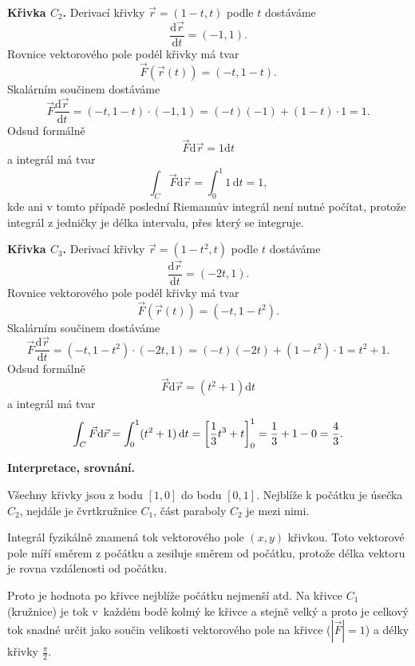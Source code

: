 \stranka

\textbf{Křivka $C_2$.}
Derivací křivky $\vec r=(1-t,t)$ podle $t$ dostáváme
$$\frac{\mathrm d\vec r}{\mathrm dt}=(-1,1).$$
Rovnice vektorového pole podél křivky má tvar
$$\vec F(\vec r(t))=(-t,1-t).$$
Skalárním součinem dostáváme
$$\vec F \frac{\mathrm d\vec r}{\mathrm dt}=
(-t,1- t)\cdot (-1,1) = (-t)(-1)+(1-t)\cdot 1 =1.
$$
Odsud formálně $$\vec F\mathrm d\vec r=1\mathrm dt$$
a integrál má tvar
$$\int_C\vec F\mathrm d\vec r=\int_0^{1}1\,\mathrm dt=1,$$
kde ani v tomto případě poslední Riemannův integrál není nutné počítat, protože integrál z jedničky je délka intervalu, přes který se integruje.

\stranka

\textbf{Křivka $C_3$.}
Derivací křivky $\vec r=(1-t^2,t)$ podle $t$ dostáváme
$$\frac{\mathrm d\vec r}{\mathrm dt}=(-2t,1).$$
Rovnice vektorového pole podél křivky má tvar
$$\vec F(\vec r(t))=(-t,1-t^2).$$
Skalárním součinem dostáváme
$$\vec F \frac{\mathrm d\vec r}{\mathrm dt}=
(-t,1- t^2)\cdot (-2t,1) = (-t)(-2t)+(1-t^2)\cdot 1 =t^2+1.
$$
Odsud formálně $$\vec F\mathrm d\vec r=(t^2+1)\mathrm dt$$
a integrál má tvar
$$\int_C\vec F\mathrm d\vec r=\int_0^{1}(t^2+1)\,\mathrm dt=
\qty[\frac 13 t^3 + t]_0^1 = \frac 13 + 1 - 0 =\frac 43.
$$

\stranka




\textbf{Interpretace, srovnání.}

Všechny křivky jsou z bodu $[1,0]$ do bodu $[0,1]$. Nejblíže k počátku je úsečka $C_2$, nejdále je čvrtkružnice $C_1$, část paraboly $C_2$ je mezi nimi.

Integrál fyzikálně znamená tok vektorového pole $(x,y)$ křivkou. Toto vektorové pole míří směrem z počátku a zesiluje směrem od počátku, protože délka vektoru je rovna vzdálenosti od počátku.

Proto je hodnota po křivce nejblíže počátku nejmenší atd. Na křivce $C_1$ (kružnice) je tok v~každém bodě kolmý ke křivce a stejně velký a proto je celkový tok snadné určit jako součin velikosti vektorového pole na křivce ($|\vec F|=1$) a délky křivky $\frac \pi 2$.


